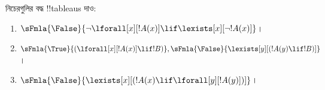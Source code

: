 \documentclass[../../../include/open-logic-section]{subfiles}
\begin{document}
\begin{prob}
নিচেরগুলির বদ্ধ !!{tableau}s দাও:
\begin{enumerate}
\item $\sFmla{\False}{\lnot\lforall[x][!A(x)] \lif \lexists[x][\lnot!A(x)]}$।
\item $\sFmla{\True}{(\lforall[x][!A(x)] \lif !B)}, \sFmla{\False}{\lexists[y][(!A(y) \lif !B)]}$।
\item $\sFmla{\False}{\lexists[x][(!A(x) \lif \lforall[y][!A(y)])]}$।
\end{enumerate}
\end{prob}
\end{document}
